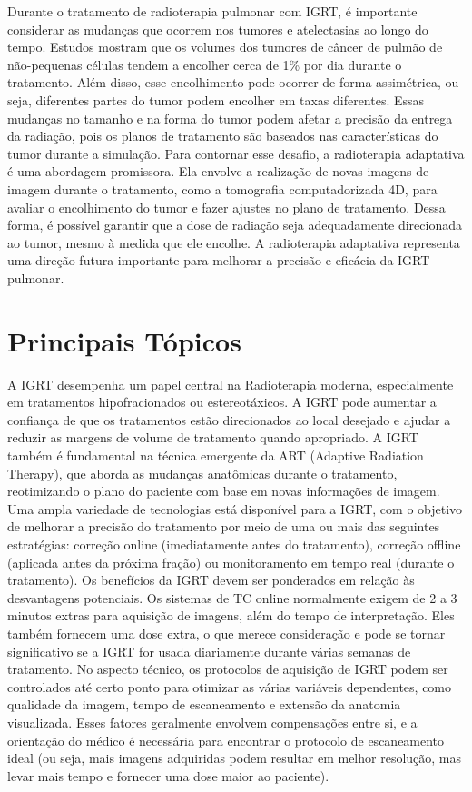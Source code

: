 \documentclass[11pt,a4paper]{article}
\begin{document}
	Durante o tratamento de radioterapia pulmonar com IGRT, é importante considerar as mudanças que ocorrem nos tumores e atelectasias ao longo do tempo. Estudos mostram que os volumes dos tumores de câncer de pulmão de não-pequenas células tendem a encolher cerca de 1\% por dia durante o tratamento. Além disso, esse encolhimento pode ocorrer de forma assimétrica, ou seja, diferentes partes do tumor podem encolher em taxas diferentes. Essas mudanças no tamanho e na forma do tumor podem afetar a precisão da entrega da radiação, pois os planos de tratamento são baseados nas características do tumor durante a simulação. Para contornar esse desafio, a radioterapia adaptativa é uma abordagem promissora. Ela envolve a realização de novas imagens de imagem durante o tratamento, como a tomografia computadorizada 4D, para avaliar o encolhimento do tumor e fazer ajustes no plano de tratamento. Dessa forma, é possível garantir que a dose de radiação seja adequadamente direcionada ao tumor, mesmo à medida que ele encolhe. A radioterapia adaptativa representa uma direção futura importante para melhorar a precisão e eficácia da IGRT pulmonar.

\section{Principais Tópicos}

	A IGRT desempenha um papel central na Radioterapia moderna, especialmente em tratamentos hipofracionados ou estereotáxicos. A IGRT pode aumentar a confiança de que os tratamentos estão direcionados ao local desejado e ajudar a reduzir as margens de volume de tratamento quando apropriado. A IGRT também é fundamental na técnica emergente da ART (Adaptive Radiation Therapy), que aborda as mudanças anatômicas durante o tratamento, reotimizando o plano do paciente com base em novas informações de imagem. Uma ampla variedade de tecnologias está disponível para a IGRT, com o objetivo de melhorar a precisão do tratamento por meio de uma ou mais das seguintes estratégias: correção online (imediatamente antes do tratamento), correção offline (aplicada antes da próxima fração) ou monitoramento em tempo real (durante o tratamento). Os benefícios da IGRT devem ser ponderados em relação às desvantagens potenciais. Os sistemas de TC online normalmente exigem de 2 a 3 minutos extras para aquisição de imagens, além do tempo de interpretação. Eles também fornecem uma dose extra, o que merece consideração e pode se tornar significativo se a IGRT for usada diariamente durante várias semanas de tratamento. No aspecto técnico, os protocolos de aquisição de IGRT podem ser controlados até certo ponto para otimizar as várias variáveis dependentes, como qualidade da imagem, tempo de escaneamento e extensão da anatomia visualizada. Esses fatores geralmente envolvem compensações entre si, e a orientação do médico é necessária para encontrar o protocolo de escaneamento ideal (ou seja, mais imagens adquiridas podem resultar em melhor resolução, mas levar mais tempo e fornecer uma dose maior ao paciente).
\end{document}
